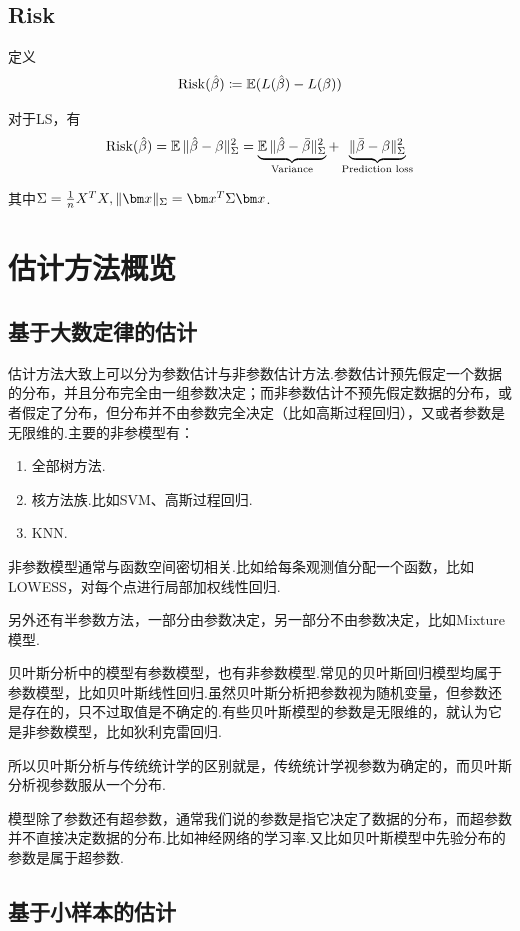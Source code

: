 \subsection{Risk}
定义
$$\operatorname{Risk}(\hat{\beta})\coloneqq \operatorname{\mathbb{E}}(L(\hat{\beta})-L(\beta))$$

对于LS，有
$$\operatorname{Risk}(\hat{\beta})=\operatorname{\mathbb{E}}\|\hat{\beta}-\beta\|_\Sigma^2=\underbrace{\operatorname{\mathbb{E}}\|\hat{\beta}-\bar{\beta}\|_\Sigma^2}_{\text{Variance}}+\underbrace{\|\bar{\beta}-\beta\|_\Sigma^2}_{\text{Prediction loss}}$$

其中$\Sigma=\frac{1}{n}X^TX,\|\bx\|_\Sigma=\bx^T\Sigma\bx$.
\section{估计方法概览}
\subsection{基于大数定律的估计}
估计方法大致上可以分为参数估计与非参数估计方法.参数估计预先假定一个数据的分布，并且分布完全由一组参数决定；而非参数估计不预先假定数据的分布，或者假定了分布，但分布并不由参数完全决定（比如高斯过程回归），又或者参数是无限维的.主要的非参模型有：

\begin{enumerate}
	\item 全部树方法.
	\item 核方法族.比如SVM、高斯过程回归.
	\item KNN.
\end{enumerate}

非参数模型通常与函数空间密切相关.比如给每条观测值分配一个函数，比如LOWESS，对每个点进行局部加权线性回归.


另外还有半参数方法，一部分由参数决定，另一部分不由参数决定，比如Mixture模型.

贝叶斯分析中的模型有参数模型，也有非参数模型.常见的贝叶斯回归模型均属于参数模型，比如贝叶斯线性回归.虽然贝叶斯分析把参数视为随机变量，但参数还是存在的，只不过取值是不确定的.有些贝叶斯模型的参数是无限维的，就认为它是非参数模型，比如狄利克雷回归.

所以贝叶斯分析与传统统计学的区别就是，传统统计学视参数为确定的，而贝叶斯分析视参数服从一个分布.

模型除了参数还有超参数，通常我们说的参数是指它决定了数据的分布，而超参数并不直接决定数据的分布.比如神经网络的学习率.又比如贝叶斯模型中先验分布的参数是属于超参数.

\subsection{基于小样本的估计}

